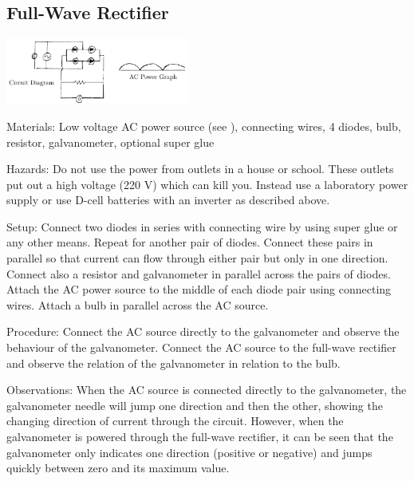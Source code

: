 \begin{multicols}{2}
\subsection{Full-Wave Rectifier}

\begin{center}
\includegraphics[width=0.45\textwidth]{./img/full-wave-rectifier.png}
\end{center}

\begin{description*}
\item[Materials:]{Low voltage AC power source (see ), connecting wires, 4 diodes, bulb, resistor, galvanometer, optional super glue}
\item[Hazards:]{Do not use the power from outlets in a house or school.  These outlets put out a high voltage (220 V) which can kill you.  Instead use a laboratory power supply or use D-cell batteries with an inverter as described above.}
\item[Setup:]{Connect two diodes in series with connecting wire by using super glue or any other means. Repeat for another pair of diodes. Connect these pairs in parallel so that current can flow through either pair but only in one direction. Connect also a resistor and galvanometer in parallel across the pairs of diodes. Attach the AC power source to the middle of each diode pair using connecting wires. Attach a bulb in parallel across the AC source.}
\item[Procedure:]{Connect the AC source directly to the galvanometer and observe the behaviour of the galvanometer. Connect the AC source to the full-wave rectifier and observe the relation of the galvanometer in relation to the bulb.}
\item[Observations:]{When the AC source is connected directly to the galvanometer, the galvanometer needle will jump one direction and then the other, showing the changing direction of current through the circuit.  However, when the galvanometer is powered through the full-wave rectifier, it can be seen that the galvanometer only indicates one direction (positive or negative) and jumps quickly between zero and its maximum value.}

\end{description*}
\end{multicols}
